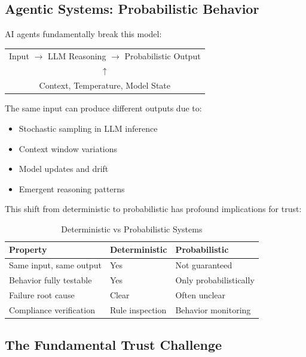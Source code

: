 \subsection{Agentic Systems: Probabilistic Behavior}
\label{subsec:probabilistic-behavior}

AI agents fundamentally break this model:

\begin{center}
\begin{tabular}{c}
Input $\rightarrow$ LLM Reasoning $\rightarrow$ Probabilistic Output \\
$\uparrow$ \\
Context, Temperature, Model State
\end{tabular}
\end{center}

The same input can produce different outputs due to:
\begin{itemize}
    \item Stochastic sampling in LLM inference
    \item Context window variations
    \item Model updates and drift
    \item Emergent reasoning patterns
\end{itemize}

This shift from deterministic to probabilistic has profound implications for trust:

\begin{table}[htbp]
\centering
\caption{Deterministic vs Probabilistic Systems}
\label{tab:deterministic-probabilistic}
\begin{tabular}{lll}
\toprule
\textbf{Property} & \textbf{Deterministic} & \textbf{Probabilistic} \\
\midrule
Same input, same output & Yes & Not guaranteed \\
Behavior fully testable & Yes & Only probabilistically \\
Failure root cause & Clear & Often unclear \\
Compliance verification & Rule inspection & Behavior monitoring \\
\bottomrule
\end{tabular}
\end{table}

\subsection{The Fundamental Trust Challenge}
\label{subsec:fundamental-challenge}

